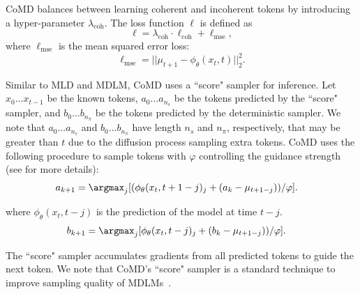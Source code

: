 \documentclass{article} %
\begin{document}
CoMD balances between learning coherent and incoherent tokens by introducing a hyper-parameter $\lambda_\mathrm{coh}$. The loss function $\ell$ is defined as
\begin{equation}
    \ell = \lambda_\mathrm{coh}\cdot \ell_{\mathrm{coh}} + \ell_\mathrm{mse}, 
\end{equation}
where $\ell_{\mathrm{mse}}$ is the mean squared error loss: 
\begin{equation}
    \ell_{\mathrm{mse}} = ||\mu_{t+1} - \phi_\theta(x_t, t)||_2^2.
\end{equation}

Similar to MLD and MDLM, CoMD uses a ``score" sampler for inference. Let $x_0...x_{t-1}$ be the known tokens, $a_0...a_{n_s}$ be the tokens predicted by the ``score" sampler, and $b_0...b_{n_\pi}$ be the tokens predicted by the deterministic sampler. We note that $a_0...a_{n_s}$ and $b_0...b_{n_\pi}$ have length $n_s$ and $n_\pi$, respectively, that may be greater than $t$ due to the diffusion process sampling extra tokens. CoMD uses the following procedure to sample tokens with $\varphi$ controlling the guidance strength (see \citet{austin2023structured} for more details):
\begin{align}
    a_{k+1} &= \argmax_{j}[(\phi_\theta(x_{t}, t+1-j)_{j}+(a_{k} - \mu_{t+1-j}))/\varphi]. \label{eq:acall_accumulate}
\end{align}

where $\phi_\theta(x_{t}, t-j)$ is the prediction of the model at time $t-j$.
\begin{align}
    b_{k+1} &= \argmax_{j}[\phi_\theta(x_{t}, t-j)_j+ (b_k-\mu_{t+1-j}))/\varphi]. \label{eq:bcall_accumulate}
\end{align}

The ``score" sampler accumulates gradients from all predicted tokens to guide the next token. We note that CoMD's ``score" sampler is a standard technique to improve sampling quality of MDLMs~\citep{austin2023structured}.
\end{document}
